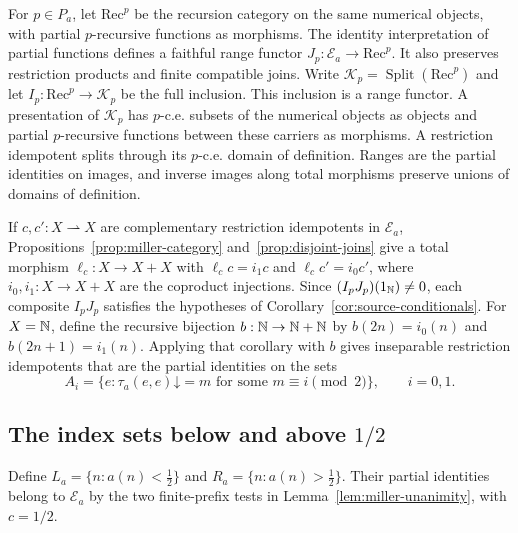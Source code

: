 For $p\in P_a$, let $\mathrm{Rec}^{p}$ be the recursion category on
the same numerical objects, with partial $p$-recursive functions as
morphisms. The identity interpretation of partial functions defines a
faithful range functor $J_p:\mathcal E_a\to\mathrm{Rec}^{p}$.
It also preserves restriction products and finite compatible joins.
Write $\mathcal K_p=\operatorname{Split}(\mathrm{Rec}^{p})$ and let
$I_p:\mathrm{Rec}^{p}\to\mathcal K_p$ be the full inclusion.
This inclusion is a range functor.
A presentation of $\mathcal K_p$ has $p$-c.e. subsets of the
numerical objects as objects and partial $p$-recursive functions between
these carriers as morphisms. A restriction idempotent splits through its
$p$-c.e. domain of definition.
Ranges are the partial identities on images, and inverse images along
total morphisms preserve unions of domains of definition.

If $c,c':X\rightharpoonup X$ are complementary restriction
idempotents in $\mathcal E_a$, Propositions~\ref{prop:miller-category}
and~\ref{prop:disjoint-joins} give a total morphism
$\ell_c:X\to X+X$ with $\ell_cc=i_1c$ and $\ell_cc'=i_0c'$,
where $i_0,i_1:X\to X+X$ are the coproduct injections.
Since $(I_pJ_p)(1_{\mathbb N})\ne0$, each composite
$I_pJ_p$ satisfies the hypotheses of Corollary~\ref{cor:source-conditionals}.
For $X=\mathbb N$, define the recursive bijection $b:\mathbb N\to\mathbb N+\mathbb N$ by
$b(2n)=i_0(n)$ and $b(2n+1)=i_1(n)$. Applying that corollary with $b$ gives inseparable
restriction idempotents that are the partial identities on the sets
\begin{equation}\label{eq:miller-diagonal-pair}
 A_i=\{e:\tau_a(e,e)\mathord\downarrow=m
                   \text{ for some }m\equiv i\pmod2\},
 \qquad i=0,1.
\end{equation}

\subsection{The index sets below and above \texorpdfstring{$1/2$}{1/2}}
\label{sec:miller-cuts}

Define $L_a=\{n:a(n)<\tfrac12\}$ and
$R_a=\{n:a(n)>\tfrac12\}$.
Their partial identities belong to $\mathcal E_a$ by the two
finite-prefix tests in Lemma~\ref{lem:miller-unanimity}, with $c=1/2$.

